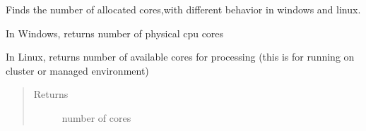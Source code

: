 \documentclass[letterpaper,10pt,english]{sphinxmanual}
\begin{document}

\begin{fulllineitems}
\label{\detokenize{mpo.utils:mpo.utils.general_utils.mpo_block}}
\end{fulllineitems}


\begin{fulllineitems}
\label{\detokenize{mpo.utils:mpo.utils.general_utils.num_cpu_cores}}
\sphinxAtStartPar
Finds the number of allocated cores,with different behavior in windows and linux.

\sphinxAtStartPar
In Windows, returns number of physical cpu cores

\sphinxAtStartPar
In Linux, returns number of available cores for processing (this is for running on cluster or managed environment)
\begin{quote}\begin{description}
\item[{Returns}] \leavevmode
\sphinxAtStartPar
number of cores

\end{description}\end{quote}

\end{fulllineitems}

\end{document}
